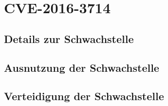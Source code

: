 \chapter{CVE-2016-3714}\label{ch:cve}

%
%
\section{Details zur Schwachstelle}\label{sec:details-zur-schwachstelle}




%
%
\section{Ausnutzung der Schwachstelle}\label{sec:ausnutzung-der-schwachstelle}













%

%
%
\section{Verteidigung der Schwachstelle}\label{sec:verteidigung-der-schwachstelle}



